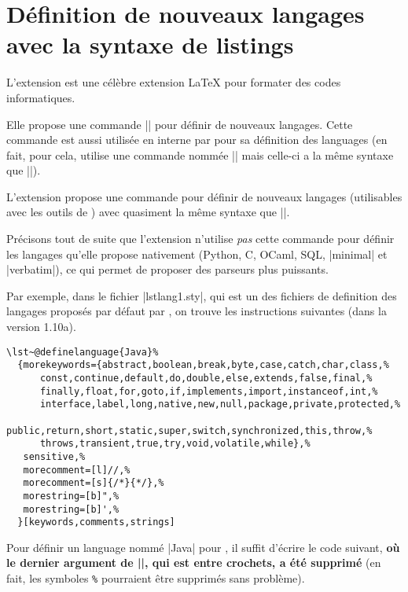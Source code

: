 \documentclass[dvipsnames,svgnames]{article}
\begin{document}
\section{Définition de nouveaux langages avec la syntaxe de listings}

\label{NewPitonLanguage}

\medskip
L'extension  est une célèbre extension LaTeX pour formater des codes informatiques.   

\medskip
Elle propose une commande |\lstdefinelanguage| pour définir de nouveaux langages. Cette
commande est aussi utilisée en interne par  pour sa définition des languages
(en fait, pour cela,  utilise une commande nommée |\lst@definelanguage| mais
celle-ci a la même syntaxe que |\lstdefinelanguage|).

\medskip
L'extension  propose une commande  pour
définir de nouveaux langages (utilisables avec les outils de ) avec quasiment
la même syntaxe que |\lstdefinelanguage|.

\medskip
Précisons tout de suite que l'extension  n'utilise \emph{pas} cette commande
pour définir les langages qu'elle propose nativement (Python, C, OCaml, SQL, |minimal| et
|verbatim|), ce qui permet de proposer des parseurs plus puissants. 

\medskip
Par exemple, dans le fichier |lstlang1.sty|, qui est un des fichiers de definition des
langages proposés par défaut par , on trouve les instructions suivantes
(dans la version 1.10a).

\begin{Verbatim}[formatcom=\small\color{gray}]
\lst~@definelanguage{Java}%
  {morekeywords={abstract,boolean,break,byte,case,catch,char,class,%
      const,continue,default,do,double,else,extends,false,final,%
      finally,float,for,goto,if,implements,import,instanceof,int,%
      interface,label,long,native,new,null,package,private,protected,%
      public,return,short,static,super,switch,synchronized,this,throw,%
      throws,transient,true,try,void,volatile,while},%
   sensitive,%
   morecomment=[l]//,%
   morecomment=[s]{/*}{*/},%
   morestring=[b]",%
   morestring=[b]',%
  }[keywords,comments,strings]
\end{Verbatim}

\medskip
Pour définir un language nommé |Java| pour , il suffit d'écrire le code
suivant, {\bfseries où le dernier argument de |\lst@definelanguage|, qui est entre
  crochets, a été supprimé} (en fait, les symboles \verb+%+ pourraient être supprimés sans
problème).
\end{document}

